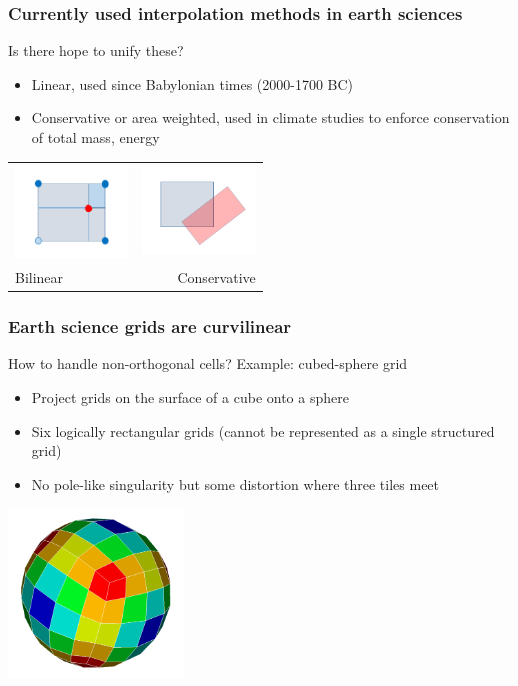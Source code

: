 \documentclass[aspectratio=169]{beamer}
\begin{document}
\begin{frame}[t]
  \frametitle{Currently used interpolation methods in earth sciences}
    \begin{block}{Is there hope to unify these?}
      \begin{itemize}%
	  \item Linear, used since Babylonian times (2000-1700 BC)
      \item Conservative or area weighted, used in climate studies to enforce conservation of total mass, energy
    \end{itemize}
  \end{block}
  \begin{tabular}{lr}
      \includegraphics[width=30mm]{bilinear.png} &               \includegraphics[width=30mm]{conservative.png} \\
      {Bilinear} & {Conservative}  
\end{tabular}
\end{frame}

\begin{frame}[t]
  \frametitle{Earth science grids are curvilinear}
  \begin{block}{How to handle non-orthogonal cells?}
    Example: cubed-sphere grid
    \begin{itemize}
      \item Project grids on the surface of a cube onto a sphere
      \item Six logically rectangular grids (cannot be represented as a single structured grid)
      \item No pole-like singularity but some distortion where three tiles meet 
    \end{itemize}
  \end{block}
  \begin{center}
    \includegraphics[width=0.35\textwidth]{cubedSphere.png}
  \end{center}
\end{frame}
\end{document}
